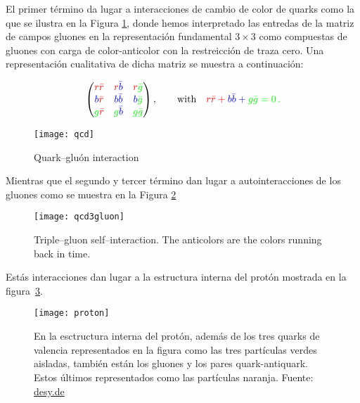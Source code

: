 El primer término da lugar a interacciones de cambio de color de quarks como la que se ilustra en la Figura \ref{fig:qcd}, donde hemos interpretado las entredas de la matriz de campos gluones en la representación fundamental $3\times3$ como compuestas de gluones con carga de color-anticolor con la restreicción de traza cero. Una representación cualitativa de dicha matriz se muestra a continuación:
\begin{frame}  
    \begin{align}
\label{eq:glu}
      \begin{pmatrix}
        \color{red}{r\bar{r}} & \color{red}{r}\color{blue}\bar{b} &\color{red}{r}\color{green}\bar{g}\\ 
        \color{blue}{b}\color{red}{\bar{r}} & \color{blue}{b\bar{b}} &\color{blue}{b}\color{green}{\bar{g}}\\ 
        \color{green}{g}\color{red}{\bar{r}} & \color{green}g\color{blue}{\bar{b}} &\color{green}{g\bar{g}}\\ 
      \end{pmatrix},\qquad\text{with}\quad 
      \color{red}{r\bar{r}}+\color{blue}{b\bar{b}}+\color{green}{g\bar{g}}=0\,.
    \end{align}

\begin{figure}
  \centering
  \texttt{[image: qcd]} %
  \caption{Quark--gluón interaction}
  \label{fig:qcd}
\end{figure}
\end{frame}
Mientras que el segundo y tercer término dan lugar a autointeracciones de los gluones como se muestra en la Figura \ref{fig:qcd3gluon}
\begin{frame}
\begin{figure}
  \centering
  \texttt{[image: qcd3gluon]}%
  \caption{Triple--gluon self--interaction. The anticolors are the colors running back in time.}
  \label{fig:qcd3gluon}
\end{figure}
\end{frame}

Estás interacciones dan lugar a la estructura interna del protón mostrada en la figura~\ref{fig:prt}.

\begin{frame}
  \begin{figure}
    \centering
  \texttt{[image: proton]}    
    \caption{En la esctructura interna del protón, además de los tres quarks de valencia representados en la figura como las tres partículas verdes aisladas, también están los gluones y los pares quark-antiquark. Estos últimos representados como las partículas naranja. Fuente: \href{http://www.desy.de/news/news_search/index_eng.html?openDirectAnchor=829}{desy.de}}
    \label{fig:prt}
  \end{figure}

\end{frame}

